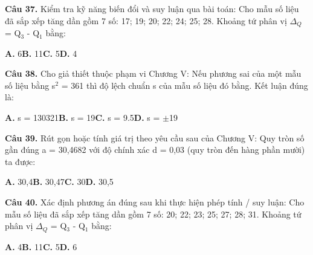 \documentclass[11pt,a4paper]{article}
\begin{document}
\textbf{\color{primary} Câu 37.} Kiểm tra kỹ năng biến đổi và suy luận qua bài toán: Cho mẫu số liệu đã sắp xếp tăng dần gồm 7 số: 17; 19; 20; 22; 24; 25; 28. Khoảng tứ phân vị $\Delta_Q$ = Q$_3$ - Q$_1$ bằng:\par
\hspace*{1.5em}\textbf{A.} 6\quad\quad \textbf{B.} 11\quad\quad \textbf{C.} 5\quad\quad \textbf{D.} 4\par\vspace{2pt}
\textbf{\color{primary} Câu 38.} Cho giả thiết thuộc phạm vi Chương V: Nếu phương sai của một mẫu số liệu bằng s$^2$ = 361 thì độ lệch chuẩn s của mẫu số liệu đó bằng. Kết luận đúng là:\par
\hspace*{1.5em}\textbf{A.} s = 130321\quad\quad \textbf{B.} s = 19\quad\quad \textbf{C.} s = 9.5\quad\quad \textbf{D.} s = $\pm$19\par\vspace{2pt}
\textbf{\color{primary} Câu 39.} Rút gọn hoặc tính giá trị theo yêu cầu sau của Chương V: Quy tròn số gần đúng a = 30,4682 với độ chính xác d = 0,03 (quy tròn đến hàng phần mười) ta được:\par
\hspace*{1.5em}\textbf{A.} 30,4\quad\quad \textbf{B.} 30,47\quad\quad \textbf{C.} 30\quad\quad \textbf{D.} 30,5\par\vspace{2pt}
\textbf{\color{primary} Câu 40.} Xác định phương án đúng sau khi thực hiện phép tính / suy luận: Cho mẫu số liệu đã sắp xếp tăng dần gồm 7 số: 20; 22; 23; 25; 27; 28; 31. Khoảng tứ phân vị $\Delta_Q$ = Q$_3$ - Q$_1$ bằng:\par
\hspace*{1.5em}\textbf{A.} 4\quad\quad \textbf{B.} 11\quad\quad \textbf{C.} 5\quad\quad \textbf{D.} 6\par\vspace{2pt}
\end{document}
